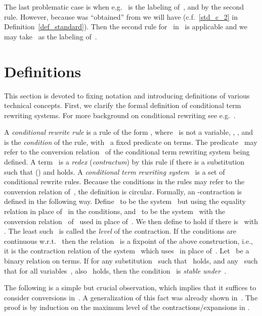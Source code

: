 \documentclass[a4paper,UKenglish]{lipics-v2016}
\begin{document}
The last problematic case is when e.g.~ is
the labeling of~, and  by
the second rule. However, because  was ``obtained''
from  we will have 
(c.f.~\ref{std_c_2} in Definition~\ref{def_standard}). Then the second
rule for~ in~ is applicable and we may take~ as the
labeling of~.

\section{Definitions}\label{sec_definitions}

This section is devoted to fixing notation and introducing definitions
of various technical concepts. First, we clarify the formal definition
of conditional term rewriting systems. For more background on
conditional rewriting see e.g.~\cite{Terese2003}.

\begin{definition}\label{def_trs}
  A \emph{conditional rewrite rule} is a rule of the form
  , where~ is not a variable,
  , ,
  and~ is the \emph{condition} of the rule,
  with~ a fixed predicate on terms. The predicate~ may refer to
  the conversion relation~ of the conditional term rewriting system
  being defined. A term~ is a \emph{redex} (\emph{contractum}) by
  this rule if there is a substitution~ such that
   () and
   holds. A \emph{conditional term
    rewriting system}~ is a set of conditional rewrite
  rules. Because the conditions in the rules may refer to the
  conversion relation of~, the definition is circular. Formally, an
  -contraction  is defined in the following
  way. Define~ to be the system~ but using the equality
  relation in place of~ in the conditions, and~ to be the
  system~ with the conversion relation~ of~ used in
  place of~. We then define  to hold if there
  is~ with . The least such~ is
  called the \emph{level} of the contraction. If the conditions are
  continuous w.r.t.~ then the relation~ is a fixpoint of
  the above construction, i.e., it is the contraction relation of the
  system~ which uses~ in place of~. Let~ be a
  binary relation on terms. If for any substitution~ such
  that~ holds, and any~
  such that  for all variables~,
  also~ holds, then the
  condition~ is \emph{stable under~}.
\end{definition}

The following is a simple but crucial observation, which implies that
it suffices to consider conversions in~. A generalization of
this fact was already shown in~\cite[Lemma~3.7]{Vrijer1999}. The proof
is by induction on the maximum level of the contractions/expansions in
.
\end{document}
